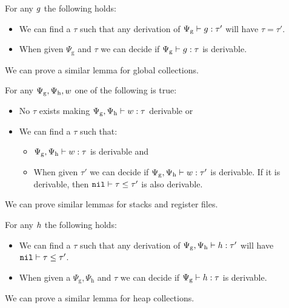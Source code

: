 \begin{lemma}
  \label{lemma:dec-g}
  For any $g$ the following holds:

  \begin{itemize}
  \item We can find a $\tau$ such that any derivation of
    ${\Psi_{\mathrm{g}}} |- {g} : {\tau'}$ will have $\tau = \tau'$.
  \item When given $\Psi_{\mathrm{g}}$ and $\tau$ we can decide if
    ${\Psi_{\mathrm{g}}} |- {g} : {\tau}$ is derivable.
  \end{itemize}

  We can prove a similar lemma for global collections.
\end{lemma}

\begin{lemma}
  For any $\Psi_{\mathrm{g}},\Psi_{\mathrm{h}},w$ one of the following
  is true:

  \begin{itemize}
  \item No $\tau$ exists making
    ${\Psi_{\mathrm{g}},\Psi_{\mathrm{h}}} |- {w} : {\tau}$ derivable or
  \item We can find a $\tau$ such that:
    \begin{itemize}
    \item ${\Psi_{\mathrm{g}},\Psi_{\mathrm{h}}} |- {w} : {\tau}$ is
      derivable and
    \item When given $\tau'$ we can decide if
      ${\Psi_{\mathrm{g}},\Psi_{\mathrm{h}}} |- {w} : {\tau'}$ is
      derivable. If it is derivable, then ${\mathtt{nil}} |- {\tau} \le {\tau'}$ is also
      derivable.
    \end{itemize}
  \end{itemize}

  We can prove similar lemmas for stacks and register files.
\end{lemma}

\begin{lemma}
  For any $h$ the following holds:

  \begin{itemize}
  \item We can find a $\tau$ such that any derivation of
    ${\Psi_{\mathrm{g}},\Psi_{\mathrm{h}}} |- {h} : {\tau'}$ will have
    ${\mathtt{nil}} |- {\tau} \le {\tau'}$.
  \item When given a $\Psi_{\mathrm{g}},\Psi_{\mathrm{h}}$ and $\tau$ we can
    decide if ${\Psi_{\mathrm{g}}} |- {h} : {\tau}$ is derivable.
  \end{itemize}

  We can prove a similar lemma for heap collections.
\end{lemma}

